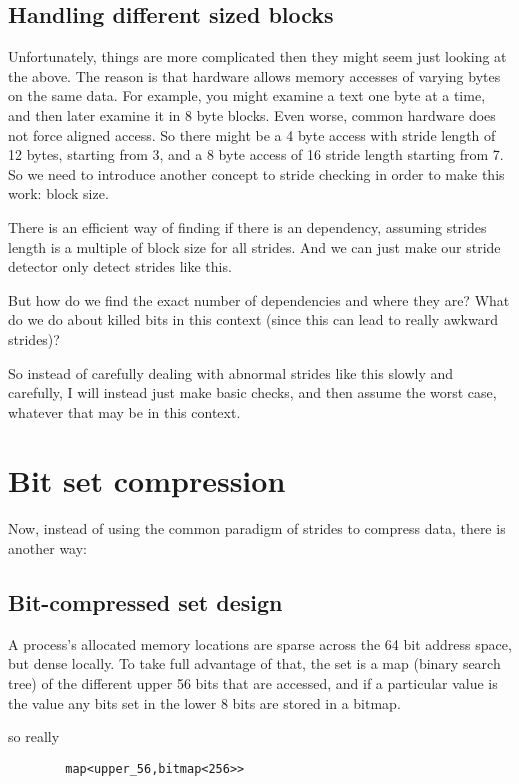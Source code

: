 \documentclass[12pt,twoside]{reedthesis}
\begin{document}
		\subsection{Handling different sized blocks}

		Unfortunately, things are more complicated then they might seem just looking at the above.
		The reason is that hardware allows memory accesses of varying bytes on the same data. For example, you might examine a text one byte at a time, and then later examine it in 8 byte blocks. Even worse, common hardware does not force aligned access. So there might be a 4 byte access with stride length of 12 bytes, starting from 3, and a 8 byte access of 16 stride length starting from 7. So we need to introduce another concept to stride checking in order to make this work: block size.

		There is an efficient way of finding if there is an dependency, assuming strides length is a multiple of block size for all strides. And we can just make our stride detector only detect strides like this.

		But how do we find the exact number of dependencies and where they are? What do we do about killed bits in this context (since this can lead to really awkward strides)?

		So instead of carefully dealing with abnormal strides like this slowly and carefully, I will instead just make basic checks, and then assume the worst case, whatever that may be in this context.

	\section{Bit set compression}

		Now, instead of using the common paradigm of strides to compress data, there is another way:

		\subsection{Bit-compressed set design}

		A process's allocated memory locations are sparse across the 64 bit address space, but dense locally. To take full advantage of that, the set is a map (binary search tree) of the different upper 56 bits that are accessed, and if a particular value is  the value any bits set in the lower 8 bits are stored in a bitmap.

		so really

		\begin{verbatim}
		map<upper_56,bitmap<256>>
		\end{verbatim}
\end{document}

